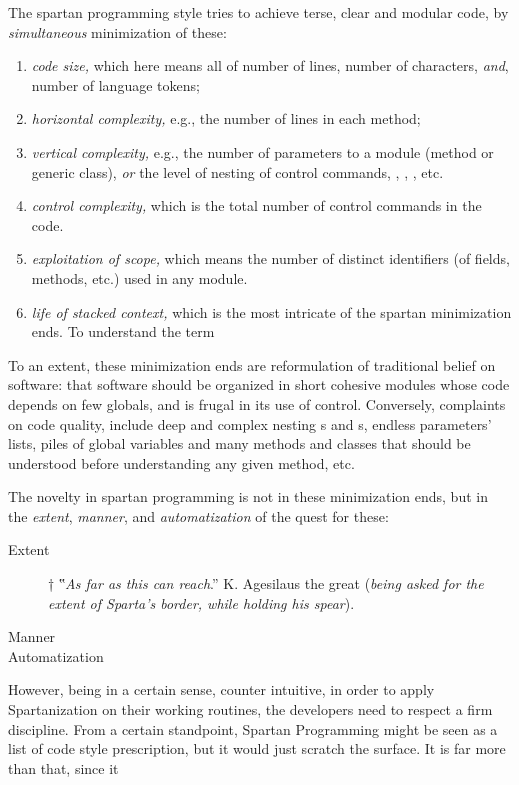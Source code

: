The spartan programming style tries to achieve terse, clear and modular code,
by \textit{simultaneous} minimization of these: 
\begin{enumerate}
  \item \textit{code size,} which here means all of number of lines, number of
    characters, \emph{and}, number of language tokens;
  \item \textit{horizontal complexity,} e.g., the number of lines in each
    method;
  \item \textit{vertical complexity,} e.g., the number of parameters to a
    module (method or generic class), \emph{or} the level of nesting of control
    commands, , , , etc.
  \item \textit{control complexity,} which is the total number of control
    commands in the code.
  \item \textit{exploitation of scope,} which means the number of distinct
    identifiers (of fields, methods, etc.) used in any module.
  \item \textit{life of stacked context,} which is the most intricate of the
    spartan minimization ends. To understand the term
\end{enumerate}

To an extent, these minimization ends are reformulation of traditional
belief on software: that software should be organized in short cohesive modules
whose code depends on few globals, and is frugal in its use of control.
Conversely, complaints on code quality, include deep and complex nesting
s and s, endless parameters' lists, piles of global variables
and many methods and classes that should be understood before understanding any
given method, etc.

The novelty in spartan programming is not in these minimization ends, but in
the \emph{extent}, \emph{manner}, and \emph{automatization} of the quest for
these:

\begin{description}
  \item[Extent]†{%
     ‟\textit{As far as this can reach}.” K. Agesilaus the great
     (\textsl{being asked for the extent of Sparta's border, while holding his spear}).
  }
  \item[Manner]
  \item[Automatization]
\end{description}

However, being in a certain sense, counter intuitive, in order to apply
Spartanization on their working routines, the developers need to respect a firm
discipline. From a certain standpoint, Spartan Programming might be seen as a
list of code style prescription, but it would just scratch the surface. It is
far more than that, since it

